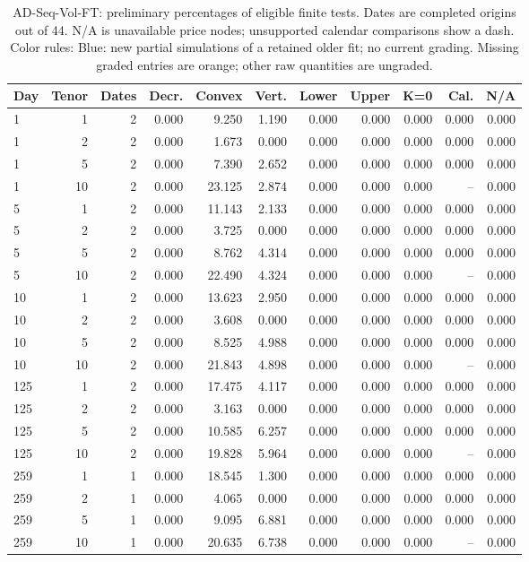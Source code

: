 \documentclass[11pt]{article}
\begin{document}
\begin{table}[H]\centering\small\setlength{\tabcolsep}{4pt}
\caption{AD-Seq-Vol-FT: preliminary percentages of eligible finite tests. Dates are completed origins out of 44. N/A is unavailable price nodes; unsupported calendar comparisons show a dash. Color rules: Blue: new partial simulations of a retained older fit; no current grading. Missing graded entries are orange; other raw quantities are ungraded.}\label{tab:diffusion-static-ft}
\begin{tabular}{@{}lrrrrrrrrrr@{}}
\toprule
Day & Tenor & Dates & Decr. & Convex & Vert. & Lower & Upper & K=0 & Cal. & N/A \\
\midrule
1 & 1 & 2 & 0.000 & 9.250 & 1.190 & 0.000 & 0.000 & 0.000 & 0.000 & 0.000 \\
1 & 2 & 2 & 0.000 & 1.673 & 0.000 & 0.000 & 0.000 & 0.000 & 0.000 & 0.000 \\
1 & 5 & 2 & 0.000 & 7.390 & 2.652 & 0.000 & 0.000 & 0.000 & 0.000 & 0.000 \\
1 & 10 & 2 & 0.000 & 23.125 & 2.874 & 0.000 & 0.000 & 0.000 & -- & 0.000 \\
5 & 1 & 2 & 0.000 & 11.143 & 2.133 & 0.000 & 0.000 & 0.000 & 0.000 & 0.000 \\
5 & 2 & 2 & 0.000 & 3.725 & 0.000 & 0.000 & 0.000 & 0.000 & 0.000 & 0.000 \\
5 & 5 & 2 & 0.000 & 8.762 & 4.314 & 0.000 & 0.000 & 0.000 & 0.000 & 0.000 \\
5 & 10 & 2 & 0.000 & 22.490 & 4.324 & 0.000 & 0.000 & 0.000 & -- & 0.000 \\
10 & 1 & 2 & 0.000 & 13.623 & 2.950 & 0.000 & 0.000 & 0.000 & 0.000 & 0.000 \\
10 & 2 & 2 & 0.000 & 3.608 & 0.000 & 0.000 & 0.000 & 0.000 & 0.000 & 0.000 \\
10 & 5 & 2 & 0.000 & 8.525 & 4.988 & 0.000 & 0.000 & 0.000 & 0.000 & 0.000 \\
10 & 10 & 2 & 0.000 & 21.843 & 4.898 & 0.000 & 0.000 & 0.000 & -- & 0.000 \\
125 & 1 & 2 & 0.000 & 17.475 & 4.117 & 0.000 & 0.000 & 0.000 & 0.000 & 0.000 \\
125 & 2 & 2 & 0.000 & 3.163 & 0.000 & 0.000 & 0.000 & 0.000 & 0.000 & 0.000 \\
125 & 5 & 2 & 0.000 & 10.585 & 6.257 & 0.000 & 0.000 & 0.000 & 0.000 & 0.000 \\
125 & 10 & 2 & 0.000 & 19.828 & 5.964 & 0.000 & 0.000 & 0.000 & -- & 0.000 \\
259 & 1 & 1 & 0.000 & 18.545 & 1.300 & 0.000 & 0.000 & 0.000 & 0.000 & 0.000 \\
259 & 2 & 1 & 0.000 & 4.065 & 0.000 & 0.000 & 0.000 & 0.000 & 0.000 & 0.000 \\
259 & 5 & 1 & 0.000 & 9.095 & 6.881 & 0.000 & 0.000 & 0.000 & 0.000 & 0.000 \\
259 & 10 & 1 & 0.000 & 20.635 & 6.738 & 0.000 & 0.000 & 0.000 & -- & 0.000 \\
\bottomrule\end{tabular}\end{table}
\end{document}
